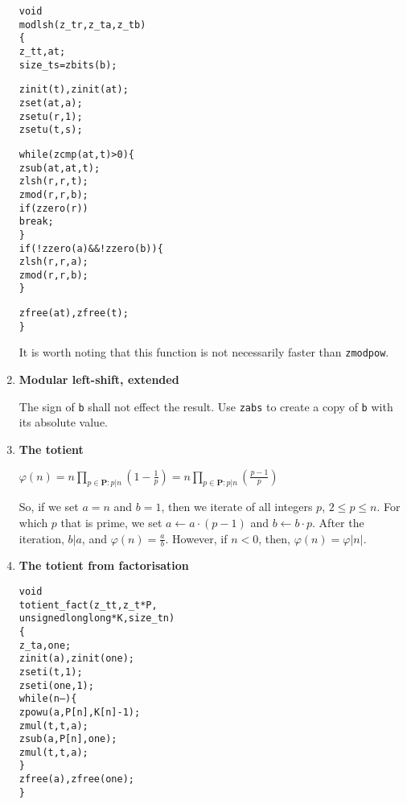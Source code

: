 \begin{enumerate}[label=\textbf{\arabic*}.]
\vspace{-1em}
\begin{alltt}
void
modlsh(z_t r, z_t a, z_t b)
\{
    z_t t, at;
    size_t s = zbits(b);

    zinit(t), zinit(at);
    zset(at, a);
    zsetu(r, 1);
    zsetu(t, s);

    while (zcmp(at, t) > 0) \{
        zsub(at, at, t);
        zlsh(r, r, t);
        zmod(r, r, b);
        if (zzero(r))
            break;
    \}
    if (!zzero(a) && !zzero(b)) \{
        zlsh(r, r, a);
        zmod(r, r, b);
    \}

    zfree(at), zfree(t);
\}
\end{alltt}
\vspace{-1em}

It is worth noting that this function is
not necessarily faster than \texttt{zmodpow}.



\item \textbf{Modular left-shift, extended}

The sign of \texttt{b} shall not effect the
result. Use \texttt{zabs} to create a copy
of \texttt{b} with its absolute value.



\item \textbf{The totient}

\( \displaystyle{
    \varphi(n)
    = n \prod_{p \in \textbf{P} : p | n} \left ( 1 - \frac{1}{p} \right )
    = n \prod_{p \in \textbf{P} : p | n} \left ( \frac{p - 1}{p} \right )
}\)

\noindent
So, if we set $a = n$ and $b = 1$, then we iterate
of all integers $p$, $2 \le p \le n$. For which $p$
that is prime, we set $a \gets a \cdot (p - 1)$ and
$b \gets b \cdot p$. After the iteration, $b | a$,
and $\varphi(n) = \frac{a}{b}$. However, if $n < 0$,
then, $\varphi(n) = \varphi|n|$.



\item \textbf{The totient from factorisation}

\vspace{-1em}
\begin{alltt}
void
totient_fact(z_t t, z_t *P,
             unsigned long long *K, size_t n)
\{
    z_t a, one;
    zinit(a), zinit(one);
    zseti(t, 1);
    zseti(one, 1);
    while (n--) \{
        zpowu(a, P[n], K[n] - 1);
        zmul(t, t, a);
        zsub(a, P[n], one);
        zmul(t, t, a);
    \}
    zfree(a), zfree(one);
\}
\end{alltt}
\vspace{-1em}




\end{enumerate}
